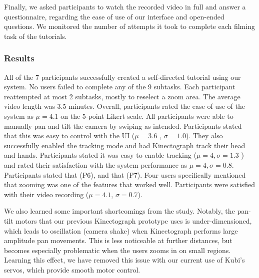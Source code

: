  Finally, we asked participants to watch the recorded video in full and answer a questionnaire, regarding the ease of use of our interface and open-ended questions. We monitored the number of attempts it took to complete each filming task of the tutorials.

\subsubsection{Results}
All of the 7 participants successfully created a self-directed tutorial using our system. No users failed to complete any of the 9 subtasks. Each participant reattempted at most 2 subtasks, mostly to reselect a zoom area. The average video length was 3.5 minutes. Overall, participants rated the ease of use of the system as $\mu=4.1$ on the 5-point Likert scale.
%
All participants were able to manually pan and tilt the camera by swiping as intended. Participants stated that this was easy to control with the UI ($\mu=3.6$ , $\sigma = 1.0$). They also successfully enabled the tracking mode and had Kinectograph track their head and hands. Participants stated it was easy to enable tracking ($\mu=4, \sigma=1.3$ ) and rated their satisfaction with the system performance as $\mu=4, \sigma=0.8$.  Participants stated that  (P6), and that  (P7). Four users specifically mentioned that zooming was one of the features that worked well. Participants were satisfied with their video recording ($\mu=4.1$, $\sigma=0.7$).


We also learned some important shortcomings from the study. Notably, the pan-tilt motors that our previous Kinectograph prototype uses is under-dimensioned, which leads to oscillation (camera shake) when Kinectograph performs large amplitude pan movements. This is less noticeable at further distances, but becomes especially problematic when the users zooms in on small regions. Learning this effect, we have removed this issue with our current use of Kubi's servos, which provide smooth motor control.

